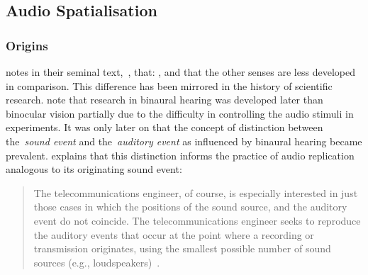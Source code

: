\subsection{Audio Spatialisation}\label{subsec:audio-spatialisation}
\subsubsection{Origins}

\citet{blauert_spatial} notes in their seminal text,~\textit{}, that: , and that the other senses are less developed in comparison.
This difference has been mirrored in the history of scientific research.
\citet{wade_binaural} note that research in binaural hearing was developed later than binocular vision partially due to the difficulty in controlling the audio stimuli in experiments.
It was only later on that the concept of distinction between the~\textit{sound event} and the~\textit{auditory event} as influenced by binaural hearing became prevalent.
\citet{blauert_spatial} explains that this distinction informs the practice of audio replication analogous to its originating sound event:

\begin{quotation}
    The telecommunications engineer, of course, is especially interested in just those cases in which the positions of the sound source, and the auditory event do not coincide.
    The telecommunications engineer seeks to reproduce the auditory events that occur at the point where a recording or transmission originates, using the smallest possible number of sound sources (e.g., loudspeakers)~\citep{blauert_spatial}.
\end{quotation}

